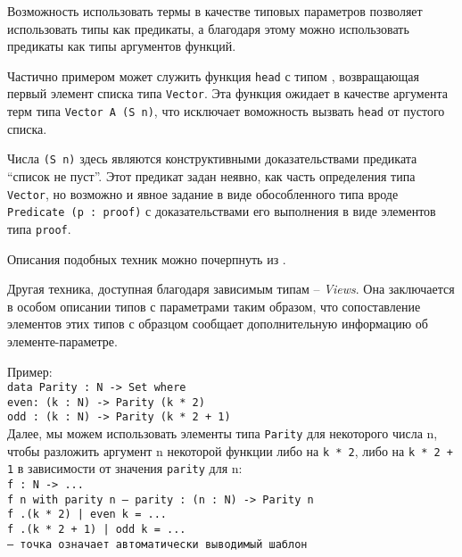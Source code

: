 \documentclass[aps,12pt,final,oneside,onecolumn,musixtex,superscriptaddress,centertags]{article}
\newcommand{\ctab}[0]{\indent\indent}
\newcommand{\ctabd}[0]{\ctab\ctab}
\newcommand{\ccode}[1]{\mbox{\texttt{#1}}}
\begin{document}
     Возможность использовать термы в качестве типовых параметров позволяет использовать типы как предикаты, а благодаря этому можно использовать предикаты как типы аргументов функций.

     Частично примером может служить функция \ccode{head} с типом \vectorheadtype, возвращающая первый элемент списка типа \ccode{Vector}. Эта функция ожидает в качестве аргумента терм типа \ccode{Vector A (S n)}, что исключает воможность вызвать \ccode{head} от пустого списка.

     Числа \ccode{(S n)} здесь являются конструктивными доказательствами предиката ``список не пуст''. Этот предикат задан неявно, как часть определения типа \ccode{Vector}, но возможно и явное задание в виде обособленного типа вроде \ccode{Predicate (p : proof)} с доказательствами его выполнения в виде элементов типа \ccode{proof}.

     Описания подобных техник можно почерпнуть из \cite{DBLP:conf/tldi/Norell09}.

     \newcommand{\paritydef}[0]{
        \ctab\ccode{data Parity : N -> Set where}\\
        \ctabd\ccode{even\hspace{2mm}: (k : N) -> Parity (k * 2)}\\
        \ctabd\ccode{odd \hspace{2mm}: (k : N) -> Parity (k * 2 + 1)}\\
     }
     \newcommand{\parityusage}[0]{
        \ctab\ccode{f : N -> ...}\\
        \ctab\ccode{f n with parity n --- parity : (n : N) -> Parity n}\\
        \ctab\ccode{f .(k * 2)     | even k = ...}\\
        \ctab\ccode{f .(k * 2 + 1) | odd  k = ...}\\
        \ctab\ccode{--- точка означает автоматически выводимый шаблон}
     }

     \newpage
     Другая техника, доступная благодаря зависимым типам -- \emph{Views}. Она заключается в особом описании типов с параметрами таким образом, что сопоставление элементов этих типов с образцом сообщает дополнительную информацию об элементе-параметре.

     Пример:\\
     \paritydef

     Далее, мы можем использовать элементы типа \ccode{Parity} для некоторого числа n, чтобы разложить аргумент n некоторой функции либо на \ccode{k * 2}, либо на \ccode{k * 2 + 1} в зависимости от значения \ccode{parity} для n:\\
     \parityusage
     \newline
\end{document}
